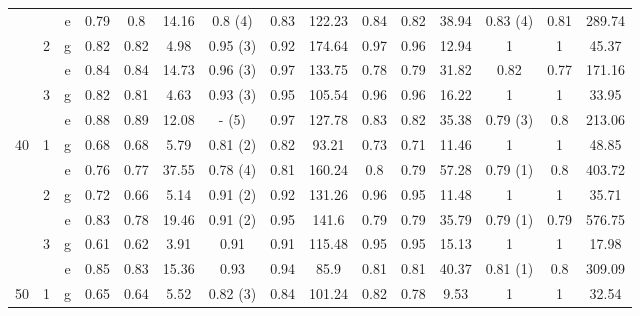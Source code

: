 \begin{table}[h!]
{\begin{tabular}{|c|c|c||ccc|ccc||ccc|ccc|}
          &       & e     & 0.79  & 0.8   & 14.16 & \textcolor[rgb]{ 1,  0,  0}{0.8 (4)} & 0.83  & 122.23 & 0.84  & 0.82  & 38.94 & \textcolor[rgb]{ 1,  0,  0}{0.83 (4)} & 0.81  & 289.74 \bigstrut[b]\\
\cline{2-15}          & \multirow{2}[2]{*}{2} & g     & 0.82  & 0.82  & 4.98  & \textcolor[rgb]{ 1,  0,  0}{0.95 (3)} & 0.92  & 174.64 & 0.97  & 0.96  & 12.94 & 1     & 1     & 45.37 \bigstrut[t]\\
          &       & e     & 0.84  & 0.84  & 14.73 & \textcolor[rgb]{ 1,  0,  0}{0.96 (3)} & 0.97  & 133.75 & 0.78  & 0.79  & 31.82 & 0.82  & 0.77  & 171.16 \bigstrut[b]\\
\cline{2-15}          & \multirow{2}[2]{*}{3} & g     & 0.82  & 0.81  & 4.63  & \textcolor[rgb]{ 1,  0,  0}{0.93 (3)} & 0.95  & 105.54 & 0.96  & 0.96  & 16.22 & 1     & 1     & 33.95 \bigstrut[t]\\
          &       & e     & 0.88  & 0.89  & 12.08 & \textcolor[rgb]{ 1,  0,  0}{- (5)} & 0.97  & 127.78 & 0.83  & 0.82  & 35.38 & \textcolor[rgb]{ 1,  0,  0}{0.79 (3)} & 0.8   & 213.06 \bigstrut[b]\\
    \hline
    \hline
    \multirow{6}[6]{*}{40} & \multirow{2}[2]{*}{1} & g     & 0.68  & 0.68  & 5.79  & \textcolor[rgb]{ 1,  0,  0}{0.81 (2)} & 0.82  & 93.21 & 0.73  & 0.71  & 11.46 & 1     & 1     & 48.85 \bigstrut[t]\\
          &       & e     & 0.76  & 0.77  & 37.55 & \textcolor[rgb]{ 1,  0,  0}{0.78 (4)} & 0.81  & 160.24 & 0.8   & 0.79  & 57.28 & \textcolor[rgb]{ 1,  0,  0}{0.79 (1)} & 0.8   & 403.72 \bigstrut[b]\\
\cline{2-15}          & \multirow{2}[2]{*}{2} & g     & 0.72  & 0.66  & 5.14  & \textcolor[rgb]{ 1,  0,  0}{0.91 (2)} & 0.92  & 131.26 & 0.96  & 0.95  & 11.48 & 1     & 1     & 35.71 \bigstrut[t]\\
          &       & e     & 0.83  & 0.78  & 19.46 & \textcolor[rgb]{ 1,  0,  0}{0.91 (2)} & 0.95  & 141.6 & 0.79  & 0.79  & 35.79 & \textcolor[rgb]{ 1,  0,  0}{0.79 (1)} & 0.79  & 576.75 \bigstrut[b]\\
\cline{2-15}          & \multirow{2}[2]{*}{3} & g     & 0.61  & 0.62  & 3.91  & 0.91  & 0.91  & 115.48 & 0.95  & 0.95  & 15.13 & 1     & 1     & 17.98 \bigstrut[t]\\
          &       & e     & 0.85  & 0.83  & 15.36 & 0.93  & 0.94  & 85.9  & 0.81  & 0.81  & 40.37 & \textcolor[rgb]{ 1,  0,  0}{0.81 (1)} & 0.8   & 309.09 \bigstrut[b]\\
    \hline
    \hline
    \multirow{6}[6]{*}{50} & \multirow{2}[2]{*}{1} & g     & 0.65  & 0.64  & 5.52  & \textcolor[rgb]{ 1,  0,  0}{0.82 (3)} & 0.84  & 101.24 & 0.82  & 0.78  & 9.53  & 1     & 1     & 32.54 \bigstrut[t]\\

\end{tabular}}
\end{table}
